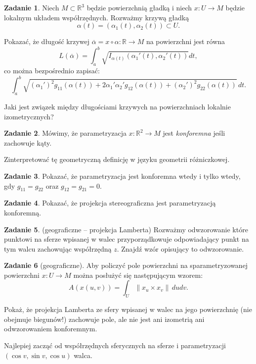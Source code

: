 \documentclass[a4paper,11pt]{article}
\theoremstyle{definition}\newtheorem{exercise}{Zadanie}
\theoremstyle{definition}\newtheorem{remark}{Uwaga}
\begin{document}
\begin{exercise}
Niech $M\subset \mathbb{R}^3$ będzie powierzchnią gładką i niech $x\colon U\to 
M$ będzie lokalnym układem współrzędnych. Rozważmy krzywą gładką 
\[\alpha(t)=(\alpha_1(t),\alpha_2(t))\subset U.\]

Pokazać, że długość krzywej $\overline{\alpha}=x\circ\alpha\colon \mathbb{R}\to 
M$ na powierzchni jest równa
\[L(\overline{\alpha})=\int_a^b\sqrt{I_{\alpha(t)}\left(\alpha_1 '(t),\alpha_2 
'(t)\right)}dt,\]
co można bezpośrednio zapisać:
\[\int_a^b\sqrt{\left(\alpha_1'\right)^2 g_{11}(\alpha(t))+ 2 
\alpha_1'\alpha_2'g_{12}(\alpha(t))+\left(\alpha_2'\right)^2 
g_{22}(\alpha(t))}\,dt.\]

Jaki jest związek między długościami krzywych na powierzchniach lokalnie 
izometrycznych?
\end{exercise} 
 

\begin{exercise}
 M\'owimy, że parametryzacja $x\colon \mathbb{R}^2\to M$ jest 
\textit{konforemna} jeśli zachowuje kąty.

Zinterpretować tę geometryczną definicję w języku geometrii r\'ożniczkowej.
\end{exercise}
 
\begin{exercise}
 Pokazać, że parametryzacja jest konforemna wtedy i tylko wtedy, gdy $g_{11} 
=g_{22} $ oraz $g_{12} =g_{21} =0$.
\end{exercise}

\begin{exercise}
 Pokazać, że projekcja stereograficzna jest parametryzacją konforemną.
\end{exercise}

\begin{exercise}(geograficzne -- projekcja Lamberta)
Rozważmy odwzorowanie kt\'ore punktowi na sferze wpisanej w walec 
przyporządkowuje odpowiadający punkt na tym walcu zachowując wsp\'ołrzędną $z$. 
Znajdź wz\'or opisujący to odwzorowanie.
\end{exercise}


\begin{exercise}[geograficzne]
Aby policzyć pole powierzchni na sparametryzowanej powierzchni $x\colon U\to M$ 
można posłużyć się następującym wzorem:
\[A\left(x(u,v)\right)=\int_U \|x_u \times x_v \|\, dudv.\]

Pokaż, że projekcja Lamberta ze sfery wpisanej w walec na jego powierzchnię 
(nie obejmuje biegun\'ow!) zachowuje pole, ale nie jest ani izometrią ani  
odwzorowaniem konforemnym.

\small{Najlepiej zacząć od wsp\'ołrzędnych sferycznych na sferze i 
parametryzacji $(\cos v,\sin v, \cos u)$ walca.}
\end{exercise}
\end{document}
